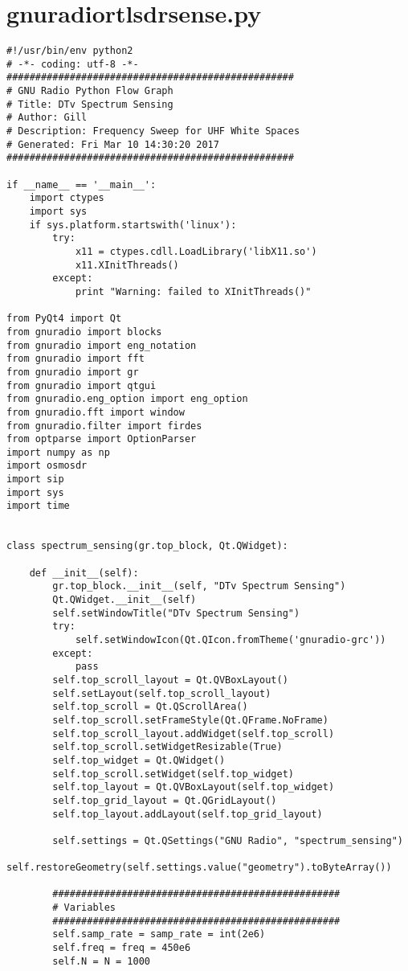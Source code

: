 \section{gnuradiortlsdrsense.py}
\begin{lstlisting}[breaklines]
#!/usr/bin/env python2
# -*- coding: utf-8 -*-
##################################################
# GNU Radio Python Flow Graph
# Title: DTv Spectrum Sensing
# Author: Gill
# Description: Frequency Sweep for UHF White Spaces
# Generated: Fri Mar 10 14:30:20 2017
##################################################

if __name__ == '__main__':
    import ctypes
    import sys
    if sys.platform.startswith('linux'):
        try:
            x11 = ctypes.cdll.LoadLibrary('libX11.so')
            x11.XInitThreads()
        except:
            print "Warning: failed to XInitThreads()"

from PyQt4 import Qt
from gnuradio import blocks
from gnuradio import eng_notation
from gnuradio import fft
from gnuradio import gr
from gnuradio import qtgui
from gnuradio.eng_option import eng_option
from gnuradio.fft import window
from gnuradio.filter import firdes
from optparse import OptionParser
import numpy as np
import osmosdr
import sip
import sys
import time


class spectrum_sensing(gr.top_block, Qt.QWidget):

    def __init__(self):
        gr.top_block.__init__(self, "DTv Spectrum Sensing")
        Qt.QWidget.__init__(self)
        self.setWindowTitle("DTv Spectrum Sensing")
        try:
            self.setWindowIcon(Qt.QIcon.fromTheme('gnuradio-grc'))
        except:
            pass
        self.top_scroll_layout = Qt.QVBoxLayout()
        self.setLayout(self.top_scroll_layout)
        self.top_scroll = Qt.QScrollArea()
        self.top_scroll.setFrameStyle(Qt.QFrame.NoFrame)
        self.top_scroll_layout.addWidget(self.top_scroll)
        self.top_scroll.setWidgetResizable(True)
        self.top_widget = Qt.QWidget()
        self.top_scroll.setWidget(self.top_widget)
        self.top_layout = Qt.QVBoxLayout(self.top_widget)
        self.top_grid_layout = Qt.QGridLayout()
        self.top_layout.addLayout(self.top_grid_layout)

        self.settings = Qt.QSettings("GNU Radio", "spectrum_sensing")
        self.restoreGeometry(self.settings.value("geometry").toByteArray())

        ##################################################
        # Variables
        ##################################################
        self.samp_rate = samp_rate = int(2e6)
        self.freq = freq = 450e6
        self.N = N = 1000


\end{lstlisting}
